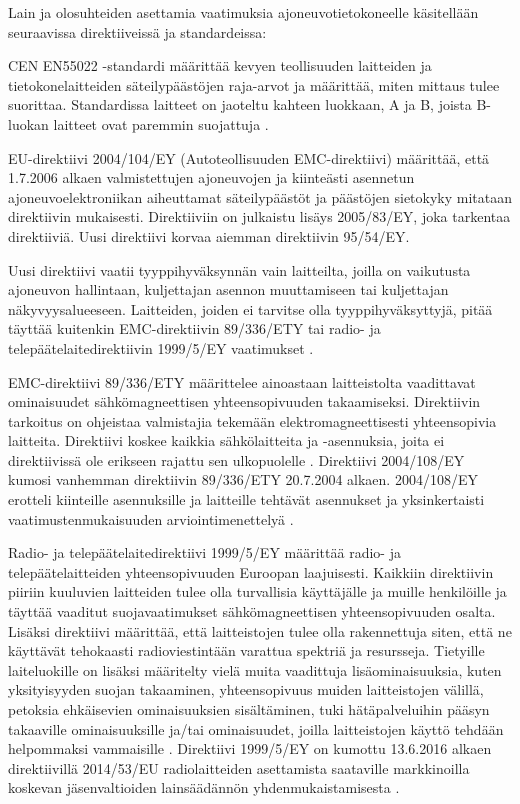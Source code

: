 Lain ja olosuhteiden asettamia vaatimuksia ajoneuvotietokoneelle käsitellään seuraavissa direktiiveissä ja standardeissa:

CEN EN55022 -standardi määrittää kevyen teollisuuden laitteiden ja tietokonelaitteiden säteilypäästöjen raja-arvot ja määrittää, miten mittaus tulee suorittaa. Standardissa laitteet on jaoteltu kahteen luokkaan, A ja B, joista B-luokan laitteet ovat paremmin suojattuja \cite{EN55022}.

EU-direktiivi 2004/104/EY (Autoteollisuuden EMC-direktiivi) määrittää, että 1.7.2006 alkaen valmistettujen ajoneuvojen ja kiinteästi asennetun ajoneuvoelektroniikan aiheuttamat säteilypäästöt ja päästöjen sietokyky mitataan direktiivin mukaisesti. Direktiiviin on julkaistu lisäys 2005/83/EY, joka tarkentaa direktiiviä. Uusi direktiivi korvaa aiemman direktiivin 95/54/EY.

Uusi direktiivi vaatii tyyppihyväksynnän vain laitteilta, joilla on
vaikutusta ajoneuvon hallintaan, kuljettajan asennon muuttamiseen tai
kuljettajan näkyvyysalueeseen. Laitteiden, joiden ei tarvitse olla
tyyppihyväksyttyjä, pitää täyttää kuitenkin EMC-direktiivin 89/336/ETY
tai radio- ja telepäätelaitedirektiivin 1999/5/EY vaatimukset \cite{1999/5/EY,89/336/ETY}.

EMC-direktiivi 89/336/ETY määrittelee ainoastaan laitteistolta vaadittavat ominaisuudet sähkömagneettisen yhteensopivuuden takaamiseksi. Direktiivin tarkoitus on ohjeistaa valmistajia tekemään elektromagneettisesti yhteensopivia laitteita. Direktiivi koskee kaikkia sähkölaitteita ja -asennuksia, joita ei direktiivissä ole erikseen rajattu sen ulkopuolelle \cite{89/336/ETY}. Direktiivi 2004/108/EY kumosi vanhemman direktiivin 89/336/ETY 20.7.2004 alkaen. 2004/108/EY  erotteli kiinteille asennuksille ja laitteille tehtävät asennukset ja yksinkertaisti vaatimustenmukaisuuden arviointimenettelyä \cite{2004/108/EY}.

Radio- ja telepäätelaitedirektiivi 1999/5/EY määrittää radio- ja telepäätelaitteiden yhteensopivuuden Euroopan laajuisesti. Kaikkiin direktiivin piiriin kuuluvien laitteiden tulee olla turvallisia käyttäjälle ja muille henkilöille ja täyttää vaaditut suojavaatimukset sähkömagneettisen yhteensopivuuden osalta. Lisäksi
direktiivi määrittää, että laitteistojen tulee olla rakennettuja siten, että ne käyttävät tehokaasti radioviestintään varattua spektriä ja resursseja. Tietyille laiteluokille on lisäksi määritelty vielä muita vaadittuja lisäominaisuuksia, kuten yksityisyyden suojan takaaminen, yhteensopivuus muiden laitteistojen välillä, petoksia ehkäisevien ominaisuuksien sisältäminen, tuki hätäpalveluihin pääsyn takaaville ominaisuuksille ja/tai ominaisuudet, joilla laitteistojen
käyttö tehdään helpommaksi vammaisille \cite{1999/5/EY}. Direktiivi 1999/5/EY on kumottu 13.6.2016 alkaen direktiivillä 2014/53/EU radiolaitteiden asettamista saataville markkinoilla koskevan jäsenvaltioiden lainsäädännön yhdenmukaistamisesta \cite{2014/53/EU}.


